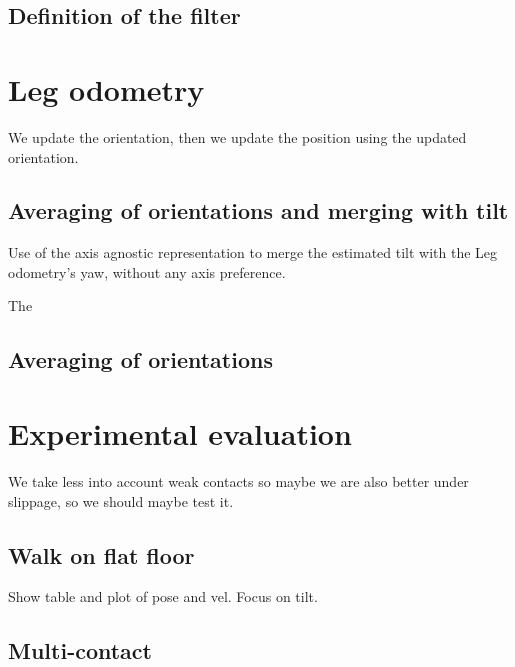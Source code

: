 \documentclass{IJCAS}
\begin{document}
\subsection{Definition of the filter}



\section{Leg odometry}


We update the orientation, then we update the position using the updated orientation.
\subsection{Averaging of orientations and merging with tilt}
Use of the axis agnostic representation to merge the estimated tilt with the Leg odometry's yaw, without any axis preference.

The 
\subsection{Averaging of orientations}



\section{Experimental evaluation}

We take less into account weak contacts so maybe we are also better under slippage, so we should maybe test it.


\subsection{Walk on flat floor}
Show table and plot of pose and vel. Focus on tilt.

\subsection{Multi-contact}
\end{document}
